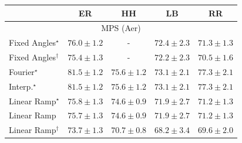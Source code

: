 \begin{tabular}{l|cccc|}
\toprule
            & ER & HH & LB & RR \\
\midrule
\multicolumn{5}{c}{\rule{0pt}{8pt}MPS (Aer)} \\
\midrule
Fixed Angles$^\star$ & {\cellcolor[HTML]{88449E}} \color[HTML]{F1F1F1} $76.0\pm 1.2$ & {\cellcolor[HTML]{000000}} \color[HTML]{F1F1F1} {\cellcolor{white}} \color{black} - & {\cellcolor[HTML]{8C79B8}} \color[HTML]{F1F1F1} $72.4\pm 2.3$ & {\cellcolor[HTML]{8C8BC0}} \color[HTML]{F1F1F1} $71.3\pm 1.3$ \\
Fixed Angles$^\dagger$ & {\cellcolor[HTML]{894DA3}} \color[HTML]{F1F1F1} $75.4\pm 1.3$ & {\cellcolor[HTML]{000000}} \color[HTML]{F1F1F1} {\cellcolor{white}} \color{black} - & {\cellcolor[HTML]{8C7DBA}} \color[HTML]{F1F1F1} $72.2\pm 2.3$ & {\cellcolor[HTML]{8C95C6}} \color[HTML]{F1F1F1} $70.5\pm 1.6$ \\
Fourier$^\star$ & {\cellcolor[HTML]{550253}} \color[HTML]{F1F1F1} $81.5\pm 1.2$ & {\cellcolor[HTML]{894BA2}} \color[HTML]{F1F1F1} $75.6\pm 1.2$ & {\cellcolor[HTML]{8C70B3}} \color[HTML]{F1F1F1} $73.1\pm 2.1$ & {\cellcolor[HTML]{852F91}} \color[HTML]{F1F1F1} $77.3\pm 2.1$ \\
Interp.$^\star$ & {\cellcolor[HTML]{550253}} \color[HTML]{F1F1F1} $81.5\pm 1.2$ & {\cellcolor[HTML]{894BA2}} \color[HTML]{F1F1F1} $75.6\pm 1.2$ & {\cellcolor[HTML]{8C70B3}} \color[HTML]{F1F1F1} $73.1\pm 2.1$ & {\cellcolor[HTML]{852F91}} \color[HTML]{F1F1F1} $77.3\pm 2.1$ \\
Linear Ramp$^\star$ & {\cellcolor[HTML]{8948A0}} \color[HTML]{F1F1F1} $75.8\pm 1.3$ & {\cellcolor[HTML]{8A59A8}} \color[HTML]{F1F1F1} $74.6\pm 0.9$ & {\cellcolor[HTML]{8C81BC}} \color[HTML]{F1F1F1} $71.9\pm 2.7$ & {\cellcolor[HTML]{8C8CC1}} \color[HTML]{F1F1F1} $71.2\pm 1.3$ \\
Linear Ramp & {\cellcolor[HTML]{8949A1}} \color[HTML]{F1F1F1} $75.7\pm 1.3$ & {\cellcolor[HTML]{8A59A8}} \color[HTML]{F1F1F1} $74.6\pm 0.9$ & {\cellcolor[HTML]{8C81BC}} \color[HTML]{F1F1F1} $71.9\pm 2.7$ & {\cellcolor[HTML]{8C8CC1}} \color[HTML]{F1F1F1} $71.2\pm 1.3$ \\
Linear Ramp$^\dagger$ & {\cellcolor[HTML]{8C66AF}} \color[HTML]{F1F1F1} $73.7\pm 1.3$ & {\cellcolor[HTML]{8C93C4}} \color[HTML]{F1F1F1} $70.7\pm 0.8$ & {\cellcolor[HTML]{9AB4D6}} \color[HTML]{000000} $68.2\pm 3.4$ & {\cellcolor[HTML]{92A3CD}} \color[HTML]{F1F1F1} $69.6\pm 2.0$ \\

\end{tabular}
